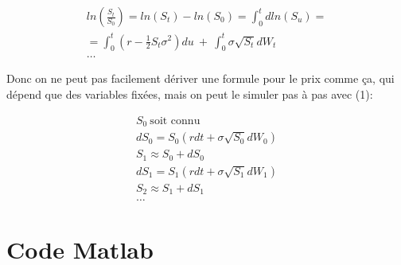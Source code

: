 \documentclass[a4paper,12pt]{scrartcl}
\begin{document}
\begin{equation} \label{5}
\begin{multlined}
ln( \frac{S_t}{S_0} ) = ln(S_t)-ln(S_0) = \int_0^t dln(S_u) = \\
= \int_0^t (r-\frac{1}{2} S_t \sigma^2)du~+~\int_0^t \sigma \sqrt{S_t}dW_t \\
\dots
\end{multlined}
\end{equation}

Donc on ne peut pas facilement dériver une formule pour le prix comme ça, qui dépend que des variables fixées, mais on peut le simuler pas à pas avec (1):

\begin{equation} \label{6}
\begin{multlined}
S_0 ~\text{soit connu} \\
dS_0 = S_0(rdt + \sigma \sqrt{S_0} dW_0) \\
S_1 \approx S_0 + dS_0 \\
dS_1 = S_1(rdt + \sigma \sqrt{S_1} dW_1) \\
S_2 \approx S_1 + dS_1 \\
\dots
\end{multlined}
\end{equation}







\appendix
\appendixpage
\addappheadtotoc

\section{Code Matlab}

\end{document}
